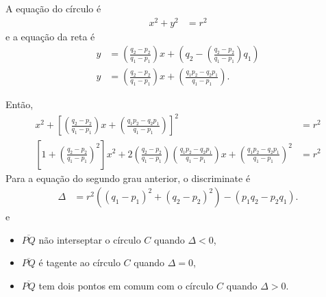 A equação do círculo é
\begin{align*}
    x^2 + y^2 &= r^2
\end{align*}
e a equação da reta é
\begin{align*}
    y &= \left( \frac{q_2 - p_2}{q_1 - p_1} \right)x + \left( q_2 - \left(
    \frac{q_2 - p_2}{q_1 - p_1} \right) q_1 \right) \\
    y &= \left( \frac{q_2 - p_2}{q_1 - p_1} \right)x + \left(
    \frac{q_1 p_2 - q_2 p_1}{q_1 - p_1} \right).
\end{align*}

Então,
\begin{align*}
    x^2  + \left[ \left( \frac{q_2 - p_2}{q_1 - p_1} \right) x + \left(
    \frac{q_1 p_2 - q_2 p_1}{q_1 - p_1} \right) \right]^2 & = r^2 \\
    \left[ 1 + \left( \frac{q_2 - p_2}{q_1 - p_1} \right)^2 \right] x^2 +
    2 \left( \frac{q_2 - p_2}{q_1 - p_1} \right) \left( \frac{q_1 p_2 - q_2
    p_1}{q_1 - p_1} \right) x + \left( 
    \frac{q_1 p_2 - q_2 p_1}{q_1 - p_1} \right)^2 & = r^2
\end{align*}
Para a equação do segundo grau anterior, o discriminate é
\begin{align*}
    \Delta &= r^2 \left( \left( q_1 - p_1 \right)^2 + \left( q_2 - p_2
    \right)^2 \right) - \left( p_1 q_2 - p_2 q_1 \right).
\end{align*}
e 
\begin{itemize}
    \item $\overline{PQ}$ não interseptar o círculo $C$ quando $\Delta < 0$,
    \item $\overline{PQ}$ é tagente ao círculo $C$ quando $\Delta = 0$,
    \item $\overline{PQ}$ tem dois pontos em comum com o círculo $C$ quando
        $\Delta > 0$.
\end{itemize}
